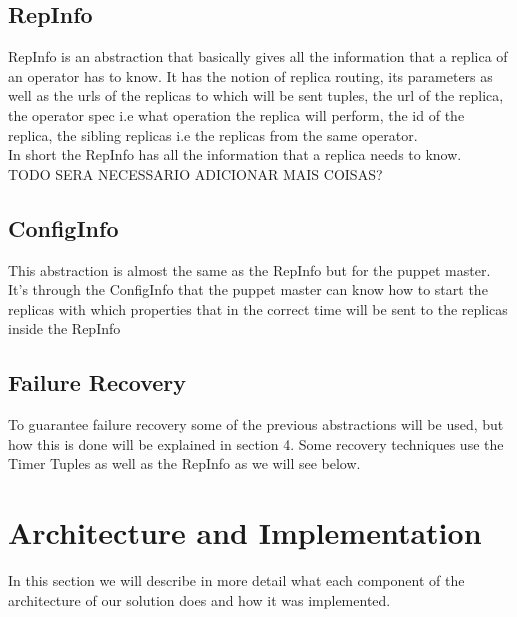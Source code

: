 \documentclass[times, 10pt, twocolumn]{article}
\begin{document}
\subsection{RepInfo}
RepInfo is an abstraction that basically gives all the information that a replica of an operator has to know. It has the notion of replica routing, its parameters as well as the urls of the replicas to which will be sent tuples, the url of the replica, the operator spec i.e what operation the replica will perform, the id of the replica, the sibling replicas i.e the replicas from the same operator. 
\\In short the RepInfo has all the information that a replica needs to know.
\\TODO SERA NECESSARIO ADICIONAR MAIS COISAS?




\subsection{ConfigInfo}
This abstraction is almost the same as the RepInfo but for the puppet master. It's through the ConfigInfo that the puppet master can know how to start the replicas with which properties that in the correct time will be sent to the replicas inside the RepInfo



\subsection{Failure Recovery}
To guarantee failure recovery some of the previous abstractions will be used, but how this is done will be explained in section 4. Some recovery techniques use the Timer Tuples as well as the RepInfo as we will see below.



\section{Architecture and Implementation}
In this section we will describe in more detail what each component of the architecture of our solution does and how it was implemented.




\end{document}
